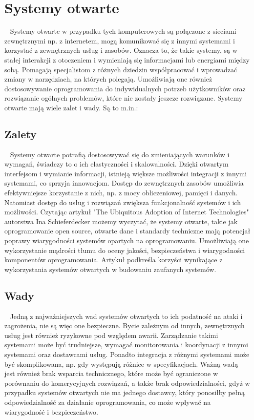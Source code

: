 \documentclass[sn-mathphys,Numbered]{sn-jnl}
\theoremstyle{thmstyleone}%
\theoremstyle{thmstyletwo}%
\theoremstyle{thmstylethree}%
\begin{document}
 \section{Systemy otwarte}
~   Systemy otwarte w przypadku tych komputerowych są połączone z sieciami zewnętrznymi np. z internetem, mogą komunikować się z innymi systemami i korzystać z zewnętrznych usług i zasobów. Oznacza to, że takie systemy, są w stałej interakcji z otoczeniem i wymieniają się informacjami lub energiami między sobą. Pomagają specjalistom z różnych dziedzin współpracować i wprowadzać zmiany w narzędziach, na których polegają. Umożliwiają one również dostosowywanie oprogramowania do indywidualnych potrzeb użytkowników oraz rozwiązanie ogólnych problemów, które nie zostały jeszcze  rozwiązane\cite{montenegro_open-source_2022-1}.
Systemy otwarte mają wiele zalet i wady. 
Są to m.in.:
\subsection{Zalety}
~   Systemy otwarte potrafią dostosowywać się do zmieniających warunków i wymagań, świadczy to o ich elastyczności i skalowalności. Dzięki otwartym interfejsom i wymianie informacji, istnieją większe możliwości integracji z innymi systemami, co sprzyja innowacjom. Dostęp do zewnętrznych zasobów umożliwia efektywniejsze korzystanie z nich, np. z mocy obliczeniowej, pamięci i danych. Natomiast dostęp do usług i rozwiązań zwiększa funkcjonalność systemów i ich możliwości. Czytając artykuł "The Ubiquitous Adoption of Internet Technologies" autorstwa Ina Schieferdecker możemy wyczytać, że systemy otwarte, takie jak oprogramowanie open source, otwarte dane i standardy techniczne mają potencjał poprawy wiarygodności systemów opartych na oprogramowaniu. Umożliwiają one wykorzystanie mądrości tłumu do oceny jakości, bezpieczeństwa i wiarygodności komponentów oprogramowania. Artykuł podkreśla korzyści wynikające z wykorzystania systemów otwartych w budowaniu zaufanych systemów\cite{schieferdecker_trustworthiness_2012}.
\subsection{Wady}
~   Jedną z najważniejszych wad systemów otwartych to ich podatność na ataki i zagrożenia, nie są więc one bezpieczne. Bycie zależnym od innych, zewnętrznych usług jest również ryzykowne pod względem awarii. Zarządzanie takimi systemami może być trudniejsze, wymagać monitorowania i koordynacji z innymi systemami oraz dostawcami usług. Ponadto integracja z różnymi systemami może być skomplikowana, np. gdy występują różnice w specyfikacjach. Ważną wadą jest również brak wsparcia technicznego, które może być ograniczone w porównaniu do komerycyjnych rozwiązań, a także brak odpowiedzialności, gdyż w przypadku systemów otwartych nie ma jednego dostawcy, który ponosiłby pełną odpowiedzialność za działanie oprogramowania, co może wpływać na wiarygodność i bezpieczeństwo\cite{montenegro_open-source_2022}.
\end{document}
